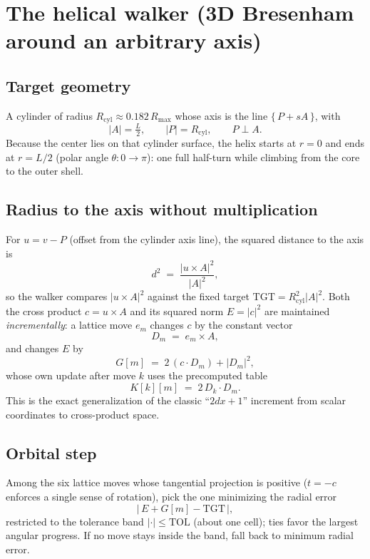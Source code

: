 \documentclass[11pt,a4paper]{article}
\begin{document}
\section{The helical walker (3D Bresenham around an arbitrary axis)}

\subsection{Target geometry}
A cylinder of radius $R_{\mathrm{cyl}} \approx 0.182\,R_{\max}$ whose axis
is the line $\{\,P + sA\,\}$, with
\begin{equation}
|A| = \tfrac{L}{2}, \qquad |P| = R_{\mathrm{cyl}}, \qquad P \perp A .
\end{equation}
Because the center lies on that cylinder surface, the helix starts at
$r = 0$ and ends at $r = L/2$ (polar angle $\theta : 0 \to \pi$): one full
half-turn while climbing from the core to the outer shell.

\subsection{Radius to the axis without multiplication}
For $u = v - P$ (offset from the cylinder axis line), the squared distance
to the axis is
\begin{equation}
d^2 \;=\; \frac{|u \times A|^2}{|A|^2},
\end{equation}
so the walker compares $|u \times A|^2$ against the fixed target
$\mathrm{TGT} = R_{\mathrm{cyl}}^2 |A|^2$. Both the cross product
$c = u \times A$ and its squared norm $E = |c|^2$ are maintained
\emph{incrementally}: a lattice move $e_m$ changes $c$ by the constant
vector
\begin{equation}
D_m \;=\; e_m \times A,
\end{equation}
and changes $E$ by
\begin{equation}
G[m] \;=\; 2\,(c \cdot D_m) + |D_m|^2,
\end{equation}
whose own update after move $k$ uses the precomputed table
\begin{equation}
K[k][m] \;=\; 2\, D_k \cdot D_m .
\end{equation}
This is the exact generalization of the classic ``$2dx + 1$'' increment
from scalar coordinates to cross-product space.

\subsection{Orbital step}
Among the six lattice moves whose tangential projection is positive
($t = -c$ enforces a single sense of rotation), pick the one minimizing
the radial error
\begin{equation}
\big|\, E + G[m] - \mathrm{TGT} \,\big|,
\end{equation}
restricted to the tolerance band $|\cdot| \le \mathrm{TOL}$ (about one
cell); ties favor the largest angular progress. If no move stays inside
the band, fall back to minimum radial error.
\end{document}
